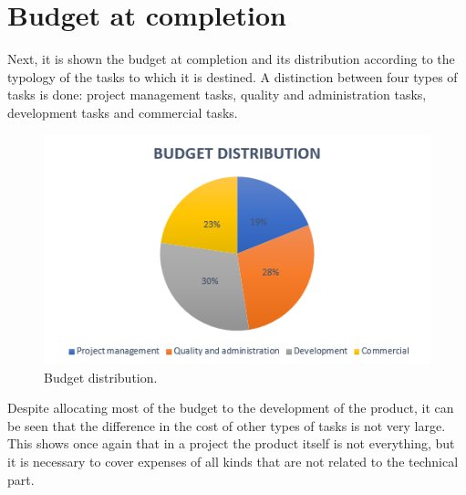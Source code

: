 \section{Budget at completion}

Next, it is shown the budget at completion and its distribution according to the typology of the tasks to which it is destined. A distinction between four types of tasks is done: project management tasks, quality and administration tasks, development tasks and commercial tasks.
\begin{figure}[H]
	\centering
	\includegraphics[width=0.8\linewidth]{./images/BudgetDistribution}
	\caption[Budget distribution]{Budget distribution.}
	\label{fig:BudgetDistribution}
\end{figure} 

Despite allocating most of the budget to the development of the product, it can be seen that the difference in the cost of other types of tasks is not very large. This shows once again that in a project the product itself is not everything, but it is necessary to cover expenses of all kinds that are not related to the technical part. 